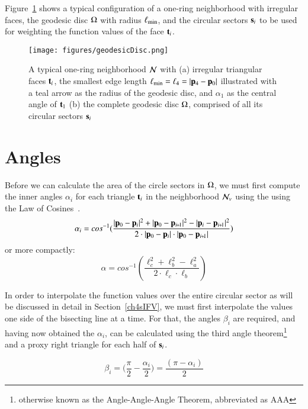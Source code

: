 Figure~\ref{fig:geodesicDisc} shows a typical configuration of a one-ring neighborhood with irregular faces, the geodesic disc $\Omega$ with radius $\ell_\text{min}$, and the circular sectors $\mathbf{s}_i$ to be used for weighting the function values of the face $\mathbf{t}_i$.

\begin{figure}[ht]
\ffigbox
	{\texttt{[image: figures/geodesicDisc.png]}}
	{\caption[One-ring and geodesic disc]{A typical one-ring neighborhood $\mathcal{N}$ with (a) irregular triangular faces $\mathbf{t}_i$, the smallest edge length $\ell_\text{min} = \ell_4 = |\mathbf{p}_4 - \mathbf{p}_0|$ illustrated with a teal arrow as the radius of the geodesic disc, and $\alpha_1$ as the central angle of $\mathbf{t}_1$ (b) the complete geodesic disc $\Omega$, comprised of all its circular sectors $\mathbf{s}_i$}\label{fig:geodesicDisc}}
\end{figure}%

%
%
%
%
\section{Angles}
\label{ch4sA}
Before we can calculate the area of the circle sectors in $\Omega$, we must first compute the inner angles $\alpha_i$ for each triangle $\mathbf{t}_i$ in the neighborhood $\mathcal{N}_v$ using the using the Law of Cosines~\cite{Weisstein19e}.
%
\begin{equation}
	\alpha_i = cos^{-1}(\frac{|\bp_0 - \bp_{i}|^2 + |\bp_0 - \bp_{\sipo}|^2 - |\bp_i - \bp_{\sipo}|^2}{2\cdot|\bp_0 - \bp_{i}|\cdot|\bp_0 - \bp_{\sipo}|})
\end{equation}
%
or more compactly:
%
\begin{equation}
	\alpha = cos^{-1}\left (\frac{\ell_c^2 + \ell_b^2 - \ell_a^2}{2\cdot\ell_c\cdot\ell_b}\right )
	\label{eq:alphaFromEdgeLengths}
\end{equation}%
%

In order to interpolate the function values over the entire circular sector as will be discussed in detail in Section~\ref{ch4sIFV}, we must first interpolate the values one side of the bisecting line at a time. For that, the angles $\beta_i$ are required, and having now obtained the $\alpha_i$, can be calculated using the third angle theorem\footnote{otherwise known as the Angle-Angle-Angle Theorem, abbreviated as AAA}~\cite{Weisstein19f} and a proxy right triangle for each half of $\mathbf{s}_i$.

\begin{equation}
	\beta_i = \Big(\frac{\pi}{2} - \frac{\alpha_i}{2}\Big) = \frac{(\pi - \alpha_i)}{2}
	\label{eq:betaFromHalfAlpha}
\end{equation}%
%

